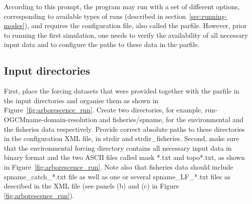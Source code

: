 \noindent According to this prompt, the program may run with a set of different options, corresponding to available types of runs (described in section~\ref{sec:running-modes}), and requires the configuration file, also called the parfile. However, prior to running the first simulation, one needs to verify the availability of all necessary input data and to configure the paths to these data in the parfile. 

\subsection{Input directories}
\label{sec:inputdir}
First, place the forcing datasets that were provided together with the parfile in the input directories and organise them as shown in Figure~\ref{fig:arborescence_run}. Create two directories, for example, run-OGCMname-domain-resolution and fisheries/spname, for the environmental and the fisheries data respectively. Provide correct absolute paths to these directories in the configuration XML file, in \textcolor{BrickRed}{{\ttfamily strdir}} and \textcolor{BrickRed}{{\ttfamily strdir\_fisheries}}. Second, make sure that the environmental forcing directory contains all necessary input data in binary format and the two ASCII files called mask *.txt and topo*.txt, as shown in Figure~\ref{fig:arborescence_run}. Note also that fisheries data should include spname\_catch\_*.txt file as well as one or several spname\_LF\_*.txt files as described in the XML file (see panels (b) and (c) in Figure \ref{fig:arborescence_run}).

